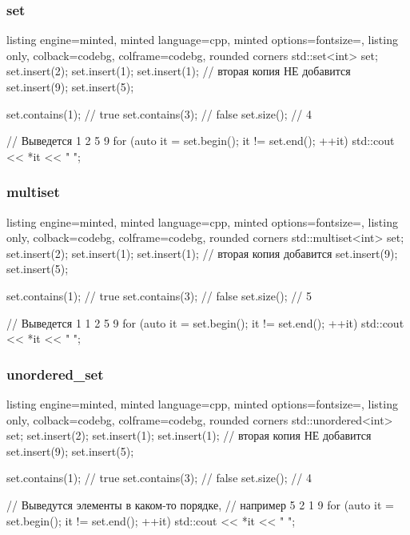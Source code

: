 \documentclass[10pt]{beamer}
\begin{document}
\begin{frame}[fragile]
\frametitle{set}
\begin{itemize}
\begin{tcblisting}{listing engine=minted, minted language=cpp, minted options={fontsize=\scriptsize}, listing only, colback=codebg, colframe=codebg, rounded corners}
std::set<int> set;
set.insert(2);
set.insert(1);
set.insert(1); // вторая копия НЕ добавится
set.insert(9);
set.insert(5);

set.contains(1); // true
set.contains(3); // false
set.size(); // 4

// Выведется 1 2 5 9
for (auto it = set.begin(); it != set.end(); ++it) {
  std::cout << *it << " ";
}
\end{tcblisting}
\end{itemize}
\end{frame}

\begin{frame}[fragile]
\frametitle{multiset}
\begin{itemize}
\begin{tcblisting}{listing engine=minted, minted language=cpp, minted options={fontsize=\scriptsize}, listing only, colback=codebg, colframe=codebg, rounded corners}
std::multiset<int> set;
set.insert(2);
set.insert(1);
set.insert(1); // вторая копия добавится
set.insert(9);
set.insert(5);

set.contains(1); // true
set.contains(3); // false
set.size(); // 5

// Выведется 1 1 2 5 9
for (auto it = set.begin(); it != set.end(); ++it) {
  std::cout << *it << " ";
}
\end{tcblisting}
\end{itemize}
\end{frame}

\begin{frame}[fragile]
\frametitle{unordered\_set}
\begin{itemize}
\begin{tcblisting}{listing engine=minted, minted language=cpp, minted options={fontsize=\scriptsize}, listing only, colback=codebg, colframe=codebg, rounded corners}
std::unordered<int> set;
set.insert(2);
set.insert(1);
set.insert(1); // вторая копия НЕ добавится
set.insert(9);
set.insert(5);

set.contains(1); // true
set.contains(3); // false
set.size(); // 4

// Выведутся элементы в каком-то порядке,
// например 5 2 1 9
for (auto it = set.begin(); it != set.end(); ++it) {
  std::cout << *it << " ";
}
\end{tcblisting}
\end{itemize}
\end{frame}
\end{document}
